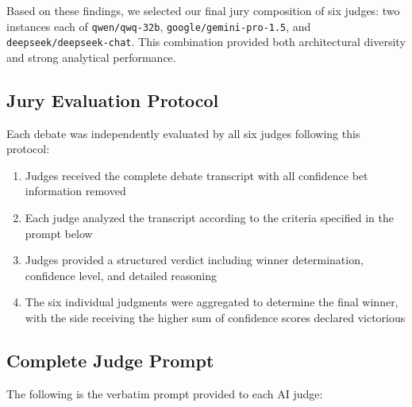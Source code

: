 \documentclass{article}
\begin{document}
Based on these findings, we selected our final jury composition of six judges: two instances each of \texttt{qwen/qwq-32b}, \texttt{google/gemini-pro-1.5}, and \texttt{deepseek/deepseek-chat}. This combination provided both architectural diversity and strong analytical performance.

\subsection{Jury Evaluation Protocol}

Each debate was independently evaluated by all six judges following this protocol:

\begin{enumerate}
    \item Judges received the complete debate transcript with all confidence bet information removed
    \item Each judge analyzed the transcript according to the criteria specified in the prompt below
    \item Judges provided a structured verdict including winner determination, confidence level, and detailed reasoning
    \item The six individual judgments were aggregated to determine the final winner, with the side receiving the higher sum of confidence scores declared victorious
\end{enumerate}

\subsection{Complete Judge Prompt}

The following is the verbatim prompt provided to each AI judge:

\end{document}
